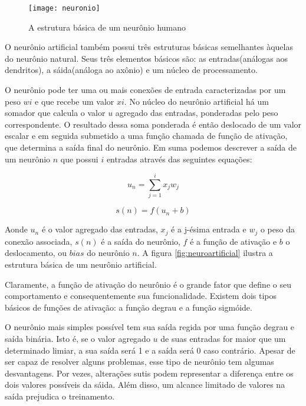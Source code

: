 \begin{figure}
\centering
\texttt{[image: neuronio]}
\label{fig:neuronio}
\caption{A estrutura básica de um neurônio humano}
\end{figure}

O neurônio artificial também possui três estruturas básicas semelhantes àquelas do neurônio natural. Seus três elementos básicos são: as entradas(análogas aos dendritos), a sáida(análoga ao axônio) e um núcleo de processamento. 

O neurônio pode ter uma ou mais conexões de entrada caracterizadas por um peso $wi$ e que recebe um valor $xi$. No núcleo do neurônio artificial há um somador que calcula o valor $u$ agregado das entradas, ponderadas pelo peso correspondente. O resultado dessa soma ponderada é então deslocado de um valor escalar e em seguida submetido a uma função chamada de função de ativação, que determina a saída final do neurônio. Em suma podemos descrever a saída de um neurônio $n$ que possui $i$ entradas através das seguintes equações:

\begin{equation}
 u_n = \sum_{j=1}^i x_jw_j
\end{equation}

\begin{equation}
s(n) = f(u_n + b)
\end{equation}

Aonde $u_n$ é o valor agregado das entradas, $x_j$ é a j-ésima entrada e $w_j$ o peso da conexão associada, $s(n)$ é a saída do neurônio, $f$ é a função de ativação e $b$ o deslocamento, ou $bias$ do neurônio $n$. A figura \ref{fig:neuroartificial} ilustra a estrutura básica de um neurônio artificial.


Claramente, a função de ativação do neurônio é o grande fator que define o seu comportamento e consequentemente sua funcionalidade. Existem dois tipos básicos de funções de ativação\cite{Haykin}: a função degrau e a função sigmóide.

O neurônio mais simples possível tem sua saída regida por uma função degrau e saída binária. Isto é, se o valor agregado $u$ de suas entradas for maior que um determinado limiar, a sua saída será 1 e a saída será 0 caso contrário. Apesar de ser capaz de resolver alguns problemas, esse tipo de neurônio tem algumas desvantagens. Por vezes, alterações sutis podem representar a diferença entre os dois valores possíveis da sáida. Além disso, um alcance limitado de valores na saída prejudica o treinamento.

